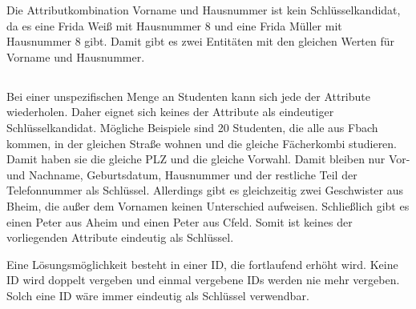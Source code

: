 \documentclass[ngerman]{gdb-aufgabenblatt}
\begin{document}
		Die Attributkombination Vorname und Hausnummer ist kein Schlüsselkandidat, da es eine Frida Weiß mit Hausnummer 8 und eine Frida Müller mit Hausnummer 8 gibt. Damit gibt es zwei Entitäten mit den gleichen Werten für Vorname und Hausnummer.
	\subsection{} %
		Bei einer unspezifischen Menge an Studenten kann sich jede der Attribute wiederholen. Daher eignet sich keines der Attribute als eindeutiger Schlüsselkandidat. Mögliche Beispiele sind 20 Studenten, die alle aus Fbach kommen, in der gleichen Straße wohnen und die gleiche Fächerkombi studieren. Damit haben sie die gleiche PLZ und die gleiche Vorwahl. Damit bleiben nur Vor- und Nachname, Geburtsdatum, Hausnummer und der restliche Teil der Telefonnummer als Schlüssel. Allerdings gibt es gleichzeitig zwei Geschwister aus Bheim, die außer dem Vornamen keinen Unterschied aufweisen. Schließlich gibt es einen Peter aus Aheim und einen Peter aus Cfeld. Somit ist keines der vorliegenden Attribute eindeutig als Schlüssel.
		
		Eine Lösungsmöglichkeit besteht in einer ID, die fortlaufend erhöht wird. Keine ID wird doppelt vergeben und einmal vergebene IDs werden nie mehr vergeben. Solch eine ID wäre immer eindeutig als Schlüssel verwendbar.
\end{document}
